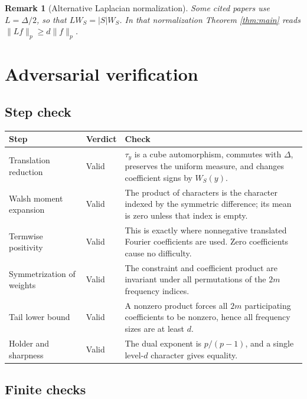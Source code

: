 \documentclass[11pt]{article}
\newtheorem{remark}{Remark}
\begin{document}
\begin{remark}[Alternative Laplacian normalization]
Some cited papers use $L=\Delta/2$, so that $LW_S=|S|W_S$.  In that
normalization Theorem \ref{thm:main} reads $\|Lf\|_p\ge d\|f\|_p$.
\end{remark}

\section{Adversarial verification}

\subsection*{Step check}

\begin{center}
\begin{tabular}{@{}>{\raggedright\arraybackslash}p{}>{\raggedright\arraybackslash}p{}>{\raggedright\arraybackslash}p{}@{}}
\toprule
Step & Verdict & Check \\
\midrule
Translation reduction & Valid & $\tau_y$ is a cube automorphism, commutes with $\Delta$, preserves the uniform measure, and changes coefficient signs by $W_S(y)$. \\
Walsh moment expansion & Valid & The product of characters is the character indexed by the symmetric difference; its mean is zero unless that index is empty. \\
Termwise positivity & Valid & This is exactly where nonnegative translated Fourier coefficients are used.  Zero coefficients cause no difficulty. \\
Symmetrization of weights & Valid & The constraint and coefficient product are invariant under all permutations of the $2m$ frequency indices. \\
Tail lower bound & Valid & A nonzero product forces all $2m$ participating coefficients to be nonzero, hence all frequency sizes are at least $d$. \\
Holder and sharpness & Valid & The dual exponent is $p/(p-1)$, and a single level-$d$ character gives equality. \\
\bottomrule
\end{tabular}
\end{center}

\subsection*{Finite checks}
\end{document}

